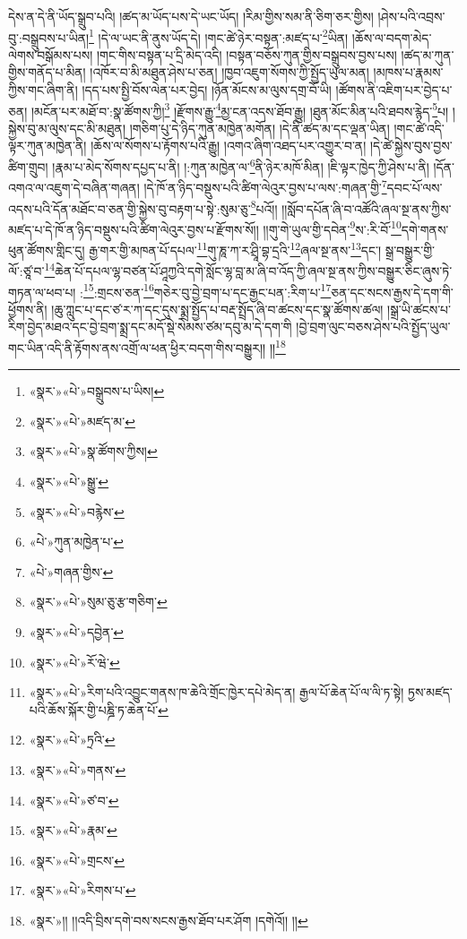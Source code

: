 དེས་ན་དེ་ནི་ཡོད་སྒྲུབ་པའི། །ཚད་མ་ཡོད་པས་དེ་ཡང་ཡོད། །རིམ་གྱིས་སམ་ནི་ཅིག་ཅར་གྱིས། །ཤེས་པའི་འབྲས་བུ་:བསྒྲུབས་པ་ཡིན།\footnote{«སྣར་»«པེ་»བསྒྲུབས་པ་ཡིས།} །དེ་ལ་ཡང་ནི་ནུས་ཡོད་དེ། །གང་ཚེ་ཉེར་བསྟན་:མཛད་པ་\footnote{«སྣར་»«པེ་»མཛད་མ་}ཡིན། །ཆོས་ལ་བདག་མེད་ལེགས་བསྒོམས་པས། །གང་གིས་བསྟན་པ་དྲི་མེད་འདི། །བསྟན་བཅོས་ཀུན་གྱིས་བསྒྲུབས་བྱས་པས། །ཚད་མ་ཀུན་གྱིས་གནོད་པ་མིན། །འཁོར་བ་མི་མཐུན་ཤེས་པ་ཅན། །ཁྱབ་འཇུག་སོགས་ཀྱི་སྤྱོད་ཡུལ་མན། །མཁས་པ་རྣམས་ཀྱིས་གང་ཞིག་ནི། །དད་པས་སྤྱི་བོས་ལེན་པར་བྱེད། །ཉོན་མོངས་མ་ལུས་དགྲ་བོ་ཡི། །ཚོགས་ནི་འཇིག་པར་བྱེད་པ་ཅན། །མངོན་པར་མཐོ་བ་:སྣ་ཚོགས་ཀྱི།\footnote{«སྣར་»«པེ་»སྣ་ཚོགས་ཀྱིས།} །རྫོགས་རྒྱུ་\footnote{«སྣར་»«པེ་»སྒྱུ་}མྱ་ངན་འདས་ཐོབ་རྒྱུ། །ཐུན་མོང་མིན་པའི་ཐབས་རྙེད་\footnote{«སྣར་»«པེ་»བརྙེས་}པ། །སྐྱེས་བུ་མ་ལུས་དང་མི་མཐུན། །གཅིག་པུ་དེ་ཉིད་ཀུན་མཁྱེན་མགོན། །དེ་ནི་ཚད་མ་དང་ལྡན་ཡིན། །གང་ཚེ་འདི་ལྟར་ཀུན་མཁྱེན་ནི། །ཆོས་ལ་སོགས་པ་རྟོགས་པའི་རྒྱུ། །འགའ་ཞིག་འཐད་པར་འགྱུར་བ་ན། །དེ་ཚེ་སྐྱེས་བུས་བྱས་ཚིག་གྲུབ། །རྣམ་པ་མེད་སོགས་དཔྱད་པ་ནི། །:ཀུན་མཁྱེན་ལ་\footnote{«པེ་»ཀུན་མཁྱེན་པ་}ནི་ཉེར་མཁོ་མིན། །ཇི་ལྟར་ཁྱེད་ཀྱི་ཤེས་པ་ནི། །དོན་འགའ་ལ་འཇུག་དེ་བཞིན་གཞན། །དེ་ཁོ་ན་ཉིད་བསྡུས་པའི་ཚིག་ལེའུར་བྱས་པ་ལས་:གཞན་གྱི་\footnote{«པེ་»གཞན་གྱིས་}དབང་པོ་ལས་འདས་པའི་དོན་མཐོང་བ་ཅན་གྱི་སྐྱེས་བུ་བརྟག་པ་སྟེ་:སུམ་ཅུ་\footnote{«སྣར་»«པེ་»སུམ་ཅུ་རྩ་གཅིག་}པའོ།། །།སློབ་དཔོན་ཞི་བ་འཚོའི་ཞལ་སྔ་ནས་ཀྱིས་མཛད་པ་དེ་ཁོ་ན་ཉིད་བསྡུས་པའི་ཚིག་ལེའུར་བྱས་པ་རྫོགས་སོ།། །།གུ་གེ་ཡུལ་གྱི་དབེན་\footnote{«སྣར་»«པེ་»དབྱེན་}ས་:རི་བོ་\footnote{«སྣར་»«པེ་»རོ་ཝེ་}དགེ་གནས་ཕུན་ཚོགས་གླིང་དུ། རྒྱ་གར་གྱི་མཁན་པོ་དཔལ་\footnote{«སྣར་»«པེ་»རིག་པའི་འབྱུང་གནས་ཁ་ཆེའི་གྲོང་ཁྱེར་དཔེ་མེད་ན། རྒྱལ་པོ་ཆེན་པོ་ལ་ལི་ཏ་སྟེ། ཏྱས་མཛད་པའི་ཆོས་སྐོར་གྱི་པཎྜི་ཏ་ཆེན་པོ་}གུ་ཎཱ་ཀ་ར་ཤྲཱི་བྷ་དྲའི་\footnote{«སྣར་»«པེ་»ཏྲའི་}ཞལ་སྔ་ནས་\footnote{«སྣར་»«པེ་»གནས་}དང་། སྒྲ་བསྒྱུར་གྱི་ལོ་:ཙཱ་བ་\footnote{«སྣར་»«པེ་»ཙ་བ་}ཆེན་པོ་དཔལ་ལྷ་བཙན་པོ་ཤཱཀྱའི་དགེ་སློང་ལྷ་བླ་མ་ཞི་བ་འོད་ཀྱི་ཞལ་སྔ་ནས་ཀྱིས་བསྒྱུར་ཅིང་ཞུས་ཏེ་གཏན་ལ་ཕབ་པ། :\footnote{«སྣར་»«པེ་»རྣམ་}:གྲངས་ཅན་\footnote{«སྣར་»«པེ་»གྲངས་}གཅེར་བུ་བྱེ་བྲག་པ་དང་རྒྱང་པན་:རིག་པ་\footnote{«སྣར་»«པེ་»རིགས་པ་}ཅན་དང་སངས་རྒྱས་དེ་དག་གི་ཕྱོགས་ནི། །ཆུ་ཀླུང་པ་དང་ཙ་ར་ཀ་དང་དུས་སྨྲ་སྤྱོད་པ་བརྡ་སྤྲོད་ཞི་བ་ཚངས་དང་སྣ་ཚོགས་ཚལ། །སྒྲ་ཡི་ཚངས་པ་རིག་བྱེད་མཐའ་དང་བྱེ་བྲག་སྨྲ་དང་མདོ་སྡེ་སེམས་ཙམ་དབུ་མ་དེ་དག་གི །བྱེ་བྲག་ལུང་བཅས་ཤེས་པའི་སྤྱོད་ཡུལ་གང་ཡིན་འདི་ནི་རྟོགས་ནས་འགྲོ་ལ་ཕན་ཕྱིར་བདག་གིས་བསྒྱུར།། །།\footnote{«སྣར་»།། །།འདི་བྲིས་དགེ་བས་སངས་རྒྱས་ཐོབ་པར་ཤོག །དགེའོ།། །།}